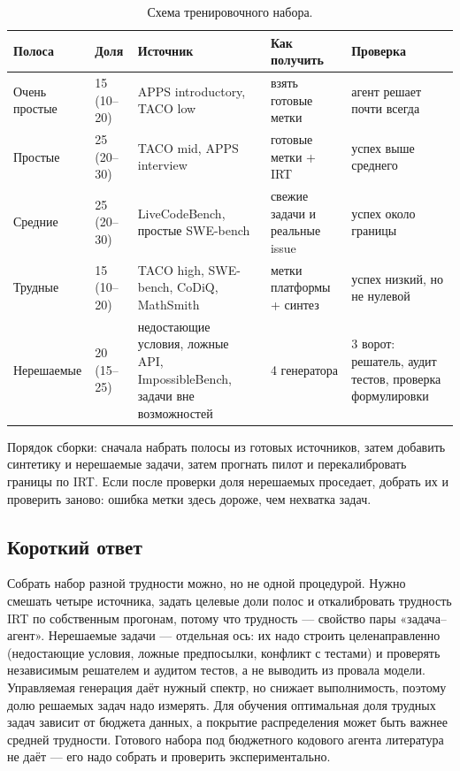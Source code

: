 \documentclass[11pt,a4paper]{article}
\begin{document}
{\small
\begin{table}[h]
\centering
\caption{Схема тренировочного набора.}\label{tab:recipe}
\begin{tabular}{@{}p{2.6cm}p{1.5cm}p{3.2cm}p{3.4cm}p{3.6cm}@{}}
\toprule
Полоса & Доля & Источник & Как получить & Проверка \\
\midrule
Очень простые & 15 (10--20) & APPS introductory, TACO low & взять готовые метки & агент решает почти всегда \\
Простые & 25 (20--30) & TACO mid, APPS interview & готовые метки + IRT & успех выше среднего \\
Средние & 25 (20--30) & LiveCodeBench, простые SWE-bench & свежие задачи и реальные issue & успех около границы \\
Трудные & 15 (10--20) & TACO high, SWE-bench, CoDiQ, MathSmith & метки платформы + синтез & успех низкий, но не нулевой \\
Нерешаемые & 20 (15--25) & недостающие условия, ложные API, ImpossibleBench, задачи вне возможностей & 4 генератора & 3 ворот: решатель, аудит тестов, проверка формулировки \\
\bottomrule
\end{tabular}
\end{table}
}

Порядок сборки: сначала набрать полосы из готовых источников, затем
добавить синтетику и нерешаемые задачи, затем прогнать пилот и
перекалибровать границы по IRT. Если после проверки доля нерешаемых
проседает, добрать их и проверить заново: ошибка метки здесь дороже, чем
нехватка задач.

\subsection{Короткий ответ}

Собрать набор разной трудности можно, но не одной процедурой. Нужно
смешать четыре источника, задать целевые доли полос и откалибровать
трудность IRT по собственным прогонам, потому что трудность — свойство пары
«задача--агент». Нерешаемые задачи — отдельная ось: их надо строить
целенаправленно (недостающие условия, ложные предпосылки, конфликт с
тестами) и проверять независимым решателем и аудитом тестов, а не выводить
из провала модели. Управляемая генерация даёт нужный спектр, но снижает
выполнимость, поэтому долю решаемых задач надо измерять. Для обучения
оптимальная доля трудных задач зависит от бюджета данных, а покрытие
распределения может быть важнее средней трудности. Готового набора под
бюджетного кодового агента литература не даёт — его надо собрать и
проверить экспериментально.
\end{document}
